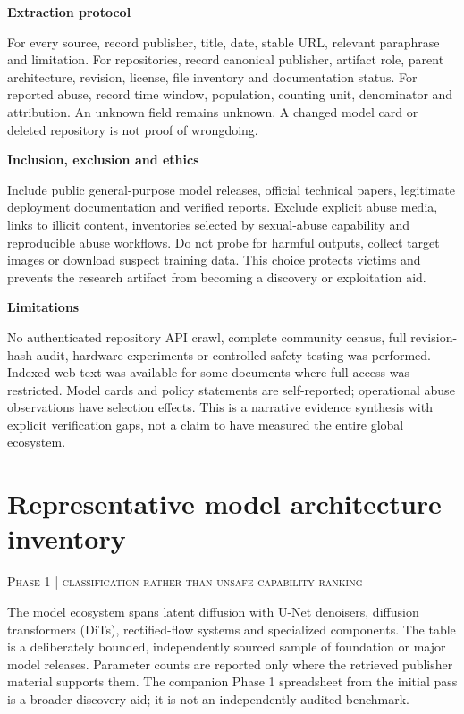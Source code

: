 \documentclass[11pt,a4paper]{article}
\newcommand{\sect}[2]{\section{#1}\textcolor{muted}{\small\textsc{#2}}\par\vspace{2mm}}
\newcommand{\sub}[1]{\vspace{1mm}\textbf{#1}\par}
\begin{document}
\sub{Extraction protocol}

For every source, record publisher, title, date, stable URL, relevant paraphrase and limitation. For repositories, record canonical publisher, artifact role, parent architecture, revision, license, file inventory and documentation status. For reported abuse, record time window, population, counting unit, denominator and attribution. An unknown field remains unknown. A changed model card or deleted repository is not proof of wrongdoing.


\sub{Inclusion, exclusion and ethics}

Include public general-purpose model releases, official technical papers, legitimate deployment documentation and verified reports. Exclude explicit abuse media, links to illicit content, inventories selected by sexual-abuse capability and reproducible abuse workflows. Do not probe for harmful outputs, collect target images or download suspect training data. This choice protects victims and prevents the research artifact from becoming a discovery or exploitation aid.


\sub{Limitations}

No authenticated repository API crawl, complete community census, full revision-hash audit, hardware experiments or controlled safety testing was performed. Indexed web text was available for some documents where full access was restricted. Model cards and policy statements are self-reported; operational abuse observations have selection effects. This is a narrative evidence synthesis with explicit verification gaps, not a claim to have measured the entire global ecosystem.


\clearpage\sect{Representative model architecture inventory}{Phase 1 | classification rather than unsafe capability ranking}

The model ecosystem spans latent diffusion with U-Net denoisers, diffusion transformers (DiTs), rectified-flow systems and specialized components. The table is a deliberately bounded, independently sourced sample of foundation or major model releases. Parameter counts are reported only where the retrieved publisher material supports them. The companion Phase 1 spreadsheet from the initial pass is a broader discovery aid; it is not an independently audited benchmark.
\end{document}
